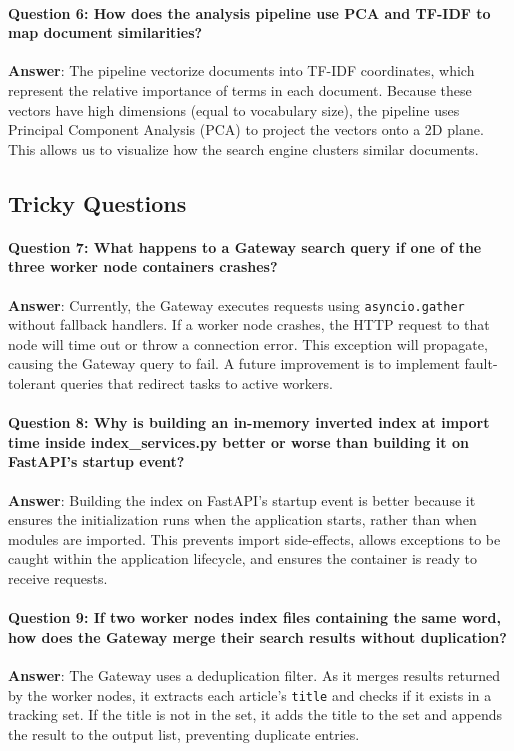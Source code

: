 \documentclass[11pt,a4paper]{article}
\begin{document}
\begin{itemize}
\paragraph{Question 6: How does the analysis pipeline use PCA and TF-IDF to map document similarities?}
\textbf{Answer}: The pipeline vectorize documents into TF-IDF coordinates, which represent the relative importance of terms in each document. Because these vectors have high dimensions (equal to vocabulary size), the pipeline uses Principal Component Analysis (PCA) to project the vectors onto a 2D plane. This allows us to visualize how the search engine clusters similar documents.

\subsection{Tricky Questions}

\paragraph{Question 7: What happens to a Gateway search query if one of the three worker node containers crashes?}
\textbf{Answer}: Currently, the Gateway executes requests using \texttt{asyncio.gather} without fallback handlers. If a worker node crashes, the HTTP request to that node will time out or throw a connection error. This exception will propagate, causing the Gateway query to fail. A future improvement is to implement fault-tolerant queries that redirect tasks to active workers.

\paragraph{Question 8: Why is building an in-memory inverted index at import time inside index\_services.py better or worse than building it on FastAPI's startup event?}
\textbf{Answer}: Building the index on FastAPI's startup event is better because it ensures the initialization runs when the application starts, rather than when modules are imported. This prevents import side-effects, allows exceptions to be caught within the application lifecycle, and ensures the container is ready to receive requests.

\paragraph{Question 9: If two worker nodes index files containing the same word, how does the Gateway merge their search results without duplication?}
\textbf{Answer}: The Gateway uses a deduplication filter. As it merges results returned by the worker nodes, it extracts each article's \texttt{title} and checks if it exists in a tracking set. If the title is not in the set, it adds the title to the set and appends the result to the output list, preventing duplicate entries.


\end{itemize}
\end{document}
